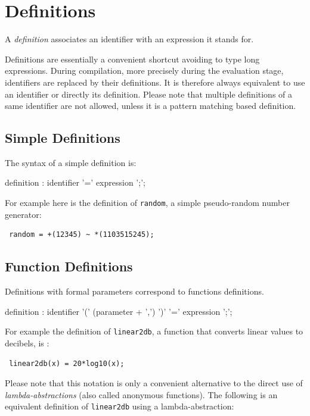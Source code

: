 \section{Definitions}

A \textit{definition} associates an identifier with an expression it stands for. 

Definitions are essentially a convenient shortcut avoiding to type long expressions. During compilation, more precisely during the evaluation stage, identifiers are replaced by their definitions. It is therefore always equivalent to use an identifier or directly its definition. Please note that multiple definitions of a same identifier are not allowed, unless it is a pattern matching based definition.

\subsection{Simple Definitions}

The syntax of a simple definition is:

\begin{rail}
definition  : identifier '=' expression ';';
\end{rail} 

For example here is the definition of \lstinline'random', a simple pseudo-random number generator:

\begin{lstlisting}
 random = +(12345) ~ *(1103515245);
\end{lstlisting}

\subsection{Function Definitions}

Definitions with formal parameters correspond to functions definitions.

\begin{rail}
definition  : identifier '(' (parameter + ',')  ')' '=' expression ';';
\end{rail} 

For example the definition of \lstinline'linear2db', a function that converts linear values to decibels, is :

\begin{lstlisting}
 linear2db(x) = 20*log10(x);
\end{lstlisting}
 
Please note that this notation is only a convenient alternative to the direct use of \textit{lambda-abstractions} (also called anonymous functions). The following is an equivalent definition of \lstinline'linear2db' using a lambda-abstraction:

